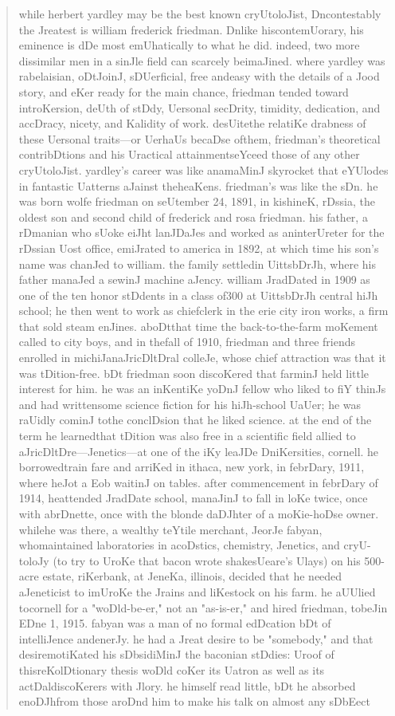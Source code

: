 \documentclass{labreport}
\begin{document}
\begin{quote}\footnotesize\ttfamily\raggedright
while herbert yardley may be the best known cryUtoloJist, Dncontestably the Jreatest is william frederick friedman. Dnlike hiscontemUorary, his eminence is dDe most emUhatically to what he did. indeed, two more dissimilar men in a sinJle field can scarcely beimaJined. where yardley was rabelaisian, oDtJoinJ, sDUerficial, free andeasy with the details of a Jood story, and eKer ready for the main chance, friedman tended toward introKersion, deUth of stDdy, Uersonal secDrity, timidity, dedication, and accDracy, nicety, and Kalidity of work. desUitethe relatiKe drabness of these Uersonal traits---or UerhaUs becaDse ofthem, friedman's theoretical contribDtions and his Uractical attainmentseYceed those of any other cryUtoloJist. yardley's career was like anamaMinJ skyrocket that eYUlodes in fantastic Uatterns aJainst theheaKens. friedman's was like the sDn. he was born wolfe friedman on seUtember 24, 1891, in kishineK, rDssia, the oldest son and second child of frederick and rosa friedman. his father, a rDmanian who sUoke eiJht lanJDaJes and worked as aninterUreter for the rDssian Uost office, emiJrated to america in 1892, at which time his son's name was chanJed to william. the family settledin UittsbDrJh, where his father manaJed a sewinJ machine aJency. william JradDated in 1909 as one of the ten honor stDdents in a class of300 at UittsbDrJh central hiJh school; he then went to work as chiefclerk in the erie city iron works, a firm that sold steam enJines. aboDtthat time the back-to-the-farm moKement called to city boys, and in thefall of 1910, friedman and three friends enrolled in michiJanaJricDltDral colleJe, whose chief attraction was that it was tDition-free. bDt friedman soon discoKered that farminJ held little interest for him. he was an inKentiKe yoDnJ fellow who liked to fiY thinJs and had writtensome science fiction for his hiJh-school UaUer; he was raUidly cominJ tothe conclDsion that he liked science. at the end of the term he learnedthat tDition was also free in a scientific field allied to aJricDltDre---Jenetics---at one of the iKy leaJDe DniKersities, cornell. he borrowedtrain fare and arriKed in ithaca, new york, in febrDary, 1911, where heJot a Eob waitinJ on tables. after commencement in febrDary of 1914, heattended JradDate school, manaJinJ to fall in loKe twice, once with abrDnette, once with the blonde daDJhter of a moKie-hoDse owner. whilehe was there, a wealthy teYtile merchant, JeorJe fabyan, whomaintained laboratories in acoDstics, chemistry, Jenetics, and cryU-toloJy (to try to UroKe that bacon wrote shakesUeare's Ulays) on his 500-acre estate, riKerbank, at JeneKa, illinois, decided that he needed aJeneticist to imUroKe the Jrains and liKestock on his farm. he aUUlied tocornell for a "woDld-be-er," not an "as-is-er," and hired friedman, tobeJin EDne 1, 1915. fabyan was a man of no formal edDcation bDt of intelliJence andenerJy. he had a Jreat desire to be "somebody," and that desiremotiKated his sDbsidiMinJ the baconian stDdies: Uroof of thisreKolDtionary thesis woDld coKer its Uatron as well as its actDaldiscoKerers with Jlory. he himself read little, bDt he absorbed enoDJhfrom those aroDnd him to make his talk on almost any sDbEect 
\end{quote}
\end{document}
